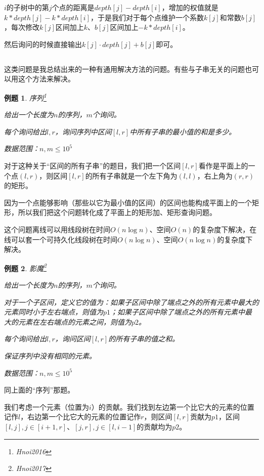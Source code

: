 \documentclass[a4paper]{article}
\newcommand{\kai}{\CJKfamily{kai}}
\newtheorem{problem}{例题}
\begin{document}
$i$的子树中的第$j$个点的距离是$depth[j]-depth[i]$，增加的权值就是$k*depth[j]-k*depth[i]$，于是我们对于每个点维护一个系数$k[j]$和常数$b[j]$，每次修改$k[j]$区间加上$k$、$b[j]$区间加上$-k*depth[i]$。

然后询问的时候直接输出$k[j]\cdot depth[j]+b[j]$即可。

\subsection{\kai{一类关于子串的问题}}

这类问题是我总结出来的一种有通用解决方法的问题。有些与子串无关的问题也可以用这个方法来解决。

\begin{problem}
  序列\footnote{Hnoi2016}

  给出一个长度为$n$的序列，$m$个询问。

  每个询问给出$l,r$，询问序列中区间$[l,r]$中所有子串的最小值的和是多少。

  数据范围：$n,m\leq 10^5$
\end{problem}

对于这种关于“区间的所有子串”的题目，我们把一个区间$[l,r]$看作是平面上的一个点$(l,r)$，则区间$[l,r]$的所有子串就是一个左下角为$(l,l)$，右上角为$(r,r)$的矩形。

因为一个点能够影响（那些以它为最小值的区间）的区间也能构成平面上的一个矩形，所以我们把这个问题转化成了平面上的矩形加、矩形查询问题。

这个问题离线可以用线段树在时间$O(n\log n)$、空间$O(n)$的复杂度下解决，在线可以套一个可持久化线段树在时间$O(n\log n)$、空间$O(n\log n)$的复杂度下解决。

\begin{problem}
  影魔\footnote{Hnoi2017}

  给出一个长度为$n$的序列，$m$个询问。

  对于一个子区间，定义它的值为：如果子区间中除了端点之外的所有元素中最大的元素同时小于左右端点，则值为$p1$；如果子区间中除了端点之外的所有元素中最大的元素在左右端点的元素之间，则值为$p2$。
  
  每个询问给出$l,r$，询问区间$[l,r]$的所有子串的值之和。

  保证序列中没有相同的元素。

  数据范围：$n,m\leq 10^5$
\end{problem}

同上面的“序列”那题。

我们考虑一个元素（位置为$i$）的贡献。我们找到左边第一个比它大的元素的位置记作$l$，右边第一个比它大的元素的位置记作$r$，则区间$[l,r]$贡献为$p1$，区间$[l,j],j\in [i+1,r]$、$[j,r],j\in [l,i-1]$的贡献均为$p2$。
\end{document}
